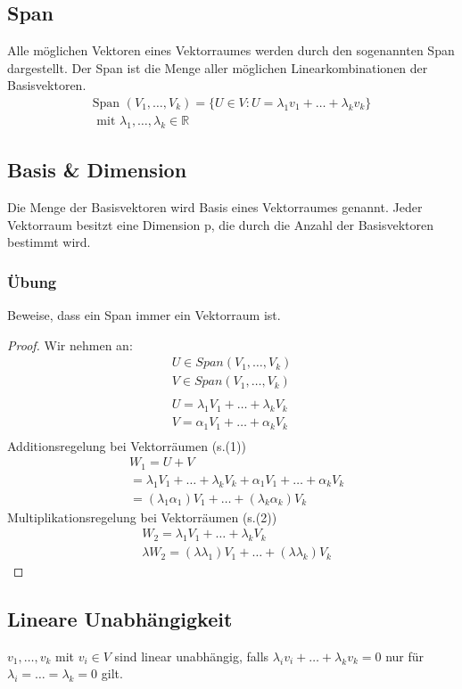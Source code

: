 \subsection{Span}
Alle m\"oglichen Vektoren eines Vektorraumes werden durch den sogenannten Span dargestellt. Der Span ist die Menge aller m\"oglichen Linearkombinationen der Basisvektoren.
\begin{align*}
\text{Span }(V_1,\dots,V_k) = \{U \in V : U = \lambda_1v_1+\dots+\lambda_kv_k\} \\
\text{ mit } \lambda_1,\dots,\lambda_k \in \mathbb{R}
\end{align*}
\subsection{Basis \& Dimension}
Die Menge der Basisvektoren wird Basis eines Vektorraumes genannt. Jeder Vektorraum besitzt eine Dimension p, die durch die Anzahl der Basisvektoren bestimmt wird.
\subsubsection*{\"Ubung}
Beweise, dass ein Span immer ein Vektorraum ist.
\begin{proof}
Wir nehmen an: 
\begin{align*}
U \in Span(V_1,\dots,V_k)\\
V \in Span(V_1,\dots,V_k)\\
\\
U = \lambda_1V_1+\dots+\lambda_kV_k\\
V = \alpha_1V_1+\dots+\alpha_kV_k\\
\end{align*}
Additionsregelung bei Vektorr\"aumen (s.(1))
\begin{align*}
	&W_1 = U+V\\
	&=\lambda_1V_1+\dots+\lambda_kV_k+\alpha_1V_1+\dots+\alpha_kV_k\\
	&= (\lambda_1\alpha_1)V_1+\dots+(\lambda_k\alpha_k)V_k
\end{align*}
Multiplikationsregelung bei Vektorr\"aumen (s.(2))
\begin{align*}
	&W_2 = \lambda_1V_1+\dots+\lambda_kV_k\\
	&\lambda W_2= (\lambda \lambda_1)V_1+\dots+(\lambda\lambda_k)V_k
\end{align*}
\end{proof}
\subsection{Lineare Unabh\"angigkeit}
$v_1,\dots,v_k$ mit $v_i \in V$ sind linear unabh\"angig, falls $\lambda_iv_i+\dots+\lambda_kv_k = 0$ nur f\"ur $\lambda_i=\dots=\lambda_k= 0$ gilt. 

%
